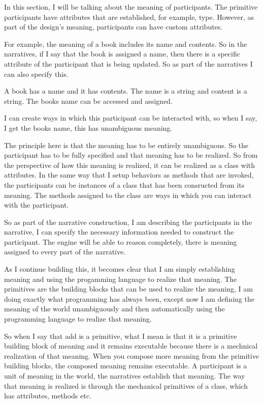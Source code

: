 In this section, I will be talking about the meaning of participants. The primitive participants have attributes that are established, for example, type. However, as part of the design's meaning, participants can have custom attributes. 

For example, the meaning of a book includes its name and contents. So in the narratives, if I say that the book is assigned a name, then there is a specific attribute of the participant that is being updated. So as part of the narratives I can also specify this.

\begin{greyquote}
    A book has a name and it has contents. The name is a string and content is a string. The books name can be accessed and assigned.
\end{greyquote}

I can create ways in which this participant can be interacted with, so when I say, I get the books name, this has unambiguous meaning.

The principle here is that the meaning has to be entirely unambiguous. So the participant has to be fully specified and that meaning has to be realized. So from the perspective of how this meaning is realized, it can be realized as a class with attributes. In the same way that I setup behaviors as methods that are invoked, the participants can be instances of a class that has been consructed from its meaning. The methods assigned to the class are ways in which you can interact with the participant. 

So as part of the narrative construction, I am describing the participants in the narrative, I can specify the necessary information needed to construct the participant. The engine will be able to reason completely, there is meaning assigned to every part of the narrative. 

As I continue building this, it becomes clear that I am simply establishing meaning and using the progamming language to realize that meaning. The primitives are the building blocks that can be used to realize the meaning, I am doing exactly what programming has always been, except now I am defining the meaning of the world unambiguously and then automatically using the programming language to realize that meaning. 

So when I say that add is a primitive, what I mean is that it is a primitive building block of meaning and it remains executable because there is a mechnical realization of that meaning. When you compose more meaning from the primitive building blocks, the composed meaning remains executable. A participant is a unit of meaning in the world, the narratives establish that meaning. The way that meaning is realized is through the mechanical primitives of a class, which has attributes, methods etc. 

